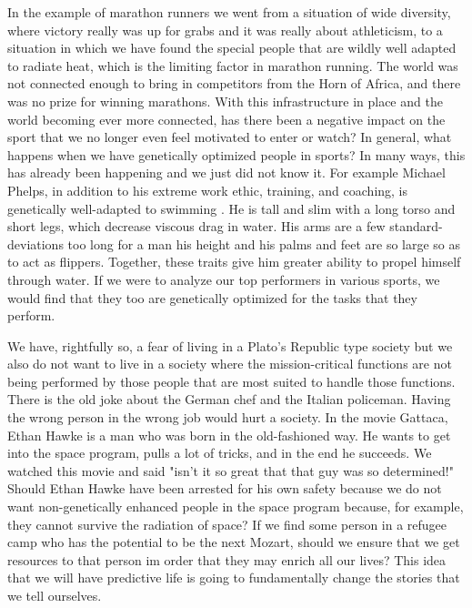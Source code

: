 In the example of marathon runners we went from a situation of wide diversity, where victory really was up for grabs and it was really about athleticism, to a situation in which we have found the special people that are wildly well adapted to radiate heat, which is the limiting factor in marathon running.
The world was not connected enough to bring in competitors from the Horn of Africa, and there was no prize for winning marathons.
With this infrastructure in place and the world becoming ever more connected, has there been a negative impact on the sport that we no longer even feel motivated to enter or watch?
In general, what happens when we have genetically optimized people in sports?
In many ways, this has already been happening and we just did not know it.
For example Michael Phelps, in addition to his extreme work ethic, training, and coaching, is genetically well-adapted to swimming \cite{Siebert2014}.
He is tall and slim with a long torso and short legs, which decrease viscous drag in water.
His arms are a few standard-deviations too long for a man his height and his palms and feet are so large so as to act as flippers.
Together, these traits give him greater ability to propel himself through water.
If we were to analyze our top performers in various sports, we would find that they too are genetically optimized for the tasks that they perform.

We have, rightfully so, a fear of living in a Plato's Republic type society but we also do not want to live in a society where the mission-critical functions are not being performed by those people that are most suited to handle those functions.
There is the old joke about the German chef and the Italian policeman.
Having the wrong person in the wrong job would hurt a society.
In the movie Gattaca, Ethan Hawke is a man who was born in the old-fashioned way.
He wants to get into the space program, pulls a lot of tricks, and in the end he succeeds.
We watched this movie and said "isn't it so great that that guy was so determined!"
Should Ethan Hawke have been arrested for his own safety because we do not want non-genetically enhanced people in the space program because, for example, they cannot survive the radiation of space?
If we find some person in a refugee camp who has the potential to be the next Mozart, should we ensure that we get resources to that person im order that they may enrich all our lives?
This idea that we will have predictive life is going to fundamentally change the stories that we tell ourselves.

